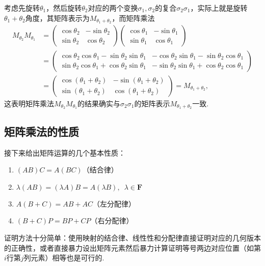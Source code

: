 \begin{example}{}{}
    考虑先旋转$\theta_1$，然后旋转$\theta_2$对应的两个变换$\sigma_1,\sigma_2$的复合$\sigma_2\sigma_1$，实际上就是旋转$\theta_1+\theta_2$角度，其矩阵表示为$M_{\theta_1+\theta_2}$，而矩阵乘法
    \begin{align*}
        M_{\theta_2}M_{\theta_1}
        & =\begin{pmatrix}
                \cos\theta_2 & -\sin\theta_2 \\
                \sin\theta_2 & \cos\theta_2
            \end{pmatrix}\begin{pmatrix}
                            \cos\theta_1 & -\sin\theta_1 \\
                            \sin\theta_1 & \cos\theta_1
                        \end{pmatrix} \\
        & =\begin{pmatrix}
                \cos\theta_2\cos\theta_1-\sin\theta_2\sin\theta_1 & -\cos\theta_2\sin\theta_1-\sin\theta_2\cos\theta_1 \\
                \sin\theta_2\cos\theta_1+\cos\theta_2\sin\theta_1 & -\sin\theta_2\sin\theta_1+\cos\theta_2\cos\theta_1
            \end{pmatrix} \\
        & =\begin{pmatrix}
                \cos(\theta_1+\theta_2) & -\sin(\theta_1+\theta_2) \\
                \sin(\theta_1+\theta_2) & \cos(\theta_1+\theta_2)
            \end{pmatrix}=M_{\theta_1+\theta_2},
    \end{align*}
    这表明矩阵乘法$M_{\theta_2}M_{\theta_1}$的结果确实与$\sigma_2\sigma_1$的矩阵表示$M_{\theta_1+\theta_2}$一致.
\end{example}

\subsection{矩阵乘法的性质}

接下来给出矩阵运算的几个基本性质：
\begin{enumerate}
    \item $(AB)C=A(BC)$（结合律）

    \item $\lambda(AB)=(\lambda A)B=A(\lambda B),\enspace \lambda \in \mathbf{F}$

    \item $A(B+C)=AB+AC$（左分配律）

    \item $(B+C)P=BP+CP$（右分配律）
\end{enumerate}
证明方法十分简单：使用映射的结合律、线性性和分配律直接证明对应的几何版本的正确性，或者直接暴力设出矩阵元素然后暴力计算证明等号两边对应位置（如第$i$行第$j$列元素）相等也是可行的.


